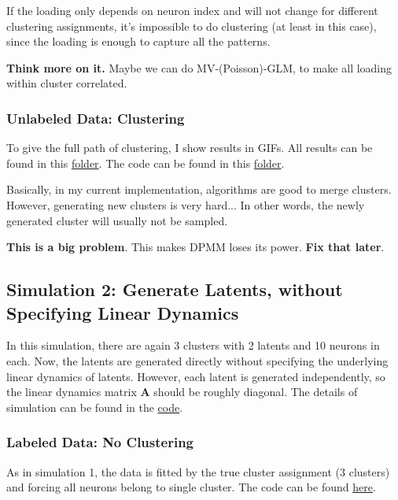 \documentclass[]{article}
\begin{document}
If the loading only depends on neuron index and will not change for different clustering assignments, it's impossible to do clustering (at least in this case), since the loading is enough to capture all the patterns.

\textbf{Think more on it.} Maybe we can do MV-(Poisson)-GLM, to make all loading within cluster correlated.


\subsubsection{Unlabeled Data: Clustering}
To give the full path of clustering, I show results in GIFs. All results can be found in this \href{https://github.com/weigcdsb/state-space-clustering/tree/main/results/gif}{folder}. The code can be found in this \href{https://github.com/weigcdsb/state-space-clustering/tree/main/LDS/blkDiag}{folder}.

Basically, in my current implementation, algorithms are good to merge clusters. However, generating new clusters is very hard... In other words, the newly generated cluster will usually not be sampled.

\textbf{This is a big problem}. This makes DPMM loses its power. \textbf{Fix that later}.

\subsection{Simulation 2: Generate Latents, without Specifying Linear Dynamics}
In this simulation, there are again 3 clusters with 2 latents and 10 neurons in each. Now, the latents are generated directly without specifying the underlying linear dynamics of latents. However, each latent is generated independently, so the linear dynamics matrix \(\mathbf{A}\) should be roughly diagonal. The details of simulation can be found in the \href{https://github.com/weigcdsb/state-space-clustering/blob/main/LDS/blkDiag/unspecifiedA_sample_blkDiag.m}{code}.

\subsubsection{Labeled Data: No Clustering}
As in simulation 1, the data is fitted by the true cluster assignment (3 clusters) and forcing all neurons belong to single cluster. The code can be found \href{https://github.com/weigcdsb/state-space-clustering/blob/main/LDS/blkDiag/unspecifiedA_sample_blkDiag.m}{here}.
\end{document}
